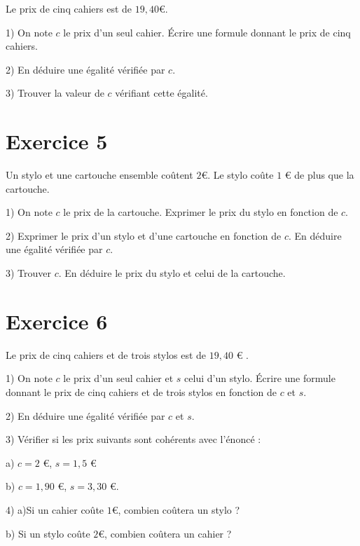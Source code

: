 \documentclass[12 pt]{article}
\theoremstyle{plain}
\newcounter{n}
\numberwithin{n}{section}
\begin{document}
Le prix de cinq cahiers est de $19,40$\euro . 

1) On note $c$ le prix d'un seul cahier. Écrire une formule donnant le prix de cinq cahiers. 

2) En déduire une égalité vérifiée par $c$. 

3) Trouver la valeur de $c$ vérifiant cette égalité. 



\section{Exercice 5}

Un stylo et une cartouche ensemble coûtent $2$\euro{}. 
Le stylo coûte $1$ \euro{} de plus que la cartouche.

1) On note $c$ le prix de la cartouche. Exprimer le prix du stylo en fonction de $c$. 

2) Exprimer le prix d'un stylo et d'une cartouche en fonction de $c$. En déduire une égalité vérifiée par $c$. 

3) Trouver $c$. En déduire le prix du stylo et celui de la cartouche.  

\section{Exercice 6}

Le prix de cinq cahiers et de trois stylos est de $19,40$ \euro{} . 

1) On note $c$ le prix d'un seul cahier et $s$ celui d'un stylo. Écrire une formule donnant le prix de cinq cahiers et de trois stylos en fonction de $c$ et $s$. 

2) En déduire une égalité vérifiée par $c$ et $s$. 

3) Vérifier si les prix suivants sont cohérents avec l'énoncé : 

a) $c= 2$ \euro{}, $s= 1,5$ \euro{}

b) $c = 1,90$ \euro{}, $s= 3, 30$ \euro{}.

4) a)Si un cahier coûte $1$\euro{}, combien coûtera un stylo ? 

b) Si un stylo coûte $2$\euro{}, combien coûtera un cahier ? 
	
\end{document}
